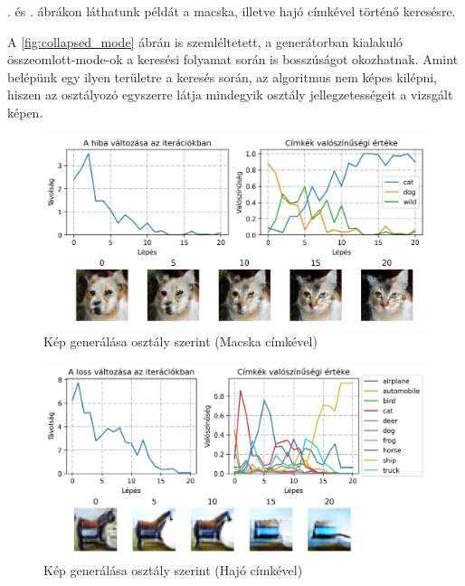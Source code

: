 . és . ábrákon láthatunk példát a macska, illetve hajó címkével történő keresésre.

A \ref{fig:collapsed_mode} ábrán is szemléltetett, a generátorban kialakuló összeomlott-mode-ok a keresési folyamat során is bosszúságot okozhatnak. Amint belépünk egy ilyen területre a keresés során, az algoritmus nem képes kilépni, hiszen az osztályozó egyszerre látja mindegyik osztály jellegzetességeit a vizsgált képen.

\begin{figure}[h]
	\centering
	\includegraphics[width=\textwidth]{images/searching-cat.png}
	\caption{Kép generálása osztály szerint (Macska címkével)}
	\label{fig:searching}
\end{figure}

\begin{figure}[h]
	\centering
	\includegraphics[width=\textwidth]{images/searching-cifar_ship.png}
	\caption{Kép generálása osztály szerint (Hajó címkével)}
	\label{fig:searching_ship}
\end{figure}
